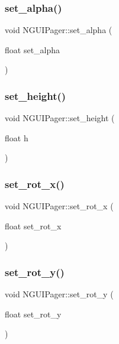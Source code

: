 \subsubsection{\texorpdfstring{set\+\_\+alpha()}{set\_alpha()}}
{\footnotesize\ttfamily void N\+G\+U\+I\+Pager\+::set\+\_\+alpha (\begin{DoxyParamCaption}\item[{float}]{set\+\_\+alpha }\end{DoxyParamCaption})}

\hypertarget{class_n_g_u_i_pager_a69a7de01a15cbed881e178771b77a7b0}{}\label{class_n_g_u_i_pager_a69a7de01a15cbed881e178771b77a7b0} 
\subsubsection{\texorpdfstring{set\+\_\+height()}{set\_height()}}
{\footnotesize\ttfamily void N\+G\+U\+I\+Pager\+::set\+\_\+height (\begin{DoxyParamCaption}\item[{float}]{h }\end{DoxyParamCaption})}

\hypertarget{class_n_g_u_i_pager_afb4280f12343e8f6b5942328a1e03489}{}\label{class_n_g_u_i_pager_afb4280f12343e8f6b5942328a1e03489} 
\subsubsection{\texorpdfstring{set\+\_\+rot\+\_\+x()}{set\_rot\_x()}}
{\footnotesize\ttfamily void N\+G\+U\+I\+Pager\+::set\+\_\+rot\+\_\+x (\begin{DoxyParamCaption}\item[{float}]{set\+\_\+rot\+\_\+x }\end{DoxyParamCaption})}

\hypertarget{class_n_g_u_i_pager_adeac17cfc05c331ebc844bbac91245cc}{}\label{class_n_g_u_i_pager_adeac17cfc05c331ebc844bbac91245cc} 
\subsubsection{\texorpdfstring{set\+\_\+rot\+\_\+y()}{set\_rot\_y()}}
{\footnotesize\ttfamily void N\+G\+U\+I\+Pager\+::set\+\_\+rot\+\_\+y (\begin{DoxyParamCaption}\item[{float}]{set\+\_\+rot\+\_\+y }\end{DoxyParamCaption})}

